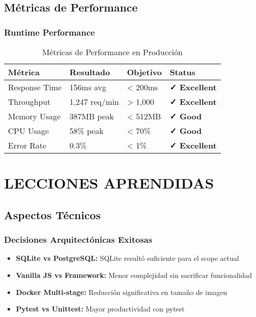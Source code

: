 \documentclass[12pt,a4paper]{article}
\begin{document}
\subsection{Métricas de Performance}

\subsubsection{Runtime Performance}

\begin{table}[h]
\centering
\begin{tabularx}{\textwidth}{|l|X|X|X|}
\hline
\textbf{Métrica} & \textbf{Resultado} & \textbf{Objetivo} & \textbf{Status} \\
\hline
Response Time & 156ms avg & < 200ms & \textcolor{epngreen}{\textbf{✓ Excellent}} \\
\hline
Throughput & 1,247 req/min & > 1,000 & \textcolor{epngreen}{\textbf{✓ Excellent}} \\
\hline
Memory Usage & 387MB peak & < 512MB & \textcolor{epngreen}{\textbf{✓ Good}} \\
\hline
CPU Usage & 58\% peak & < 70\% & \textcolor{epngreen}{\textbf{✓ Good}} \\
\hline
Error Rate & 0.3\% & < 1\% & \textcolor{epngreen}{\textbf{✓ Excellent}} \\
\hline
\end{tabularx}
\caption{Métricas de Performance en Producción}
\end{table}

\section{LECCIONES APRENDIDAS}

\subsection{Aspectos Técnicos}

\subsubsection{Decisiones Arquitectónicas Exitosas}

\begin{itemize}
    \item \textbf{SQLite vs PostgreSQL:} SQLite resultó suficiente para el scope actual
    \item \textbf{Vanilla JS vs Framework:} Menor complejidad sin sacrificar funcionalidad
    \item \textbf{Docker Multi-stage:} Reducción significativa en tamaño de imagen
    \item \textbf{Pytest vs Unittest:} Mayor productividad con pytest
\end{itemize}
\end{document}

